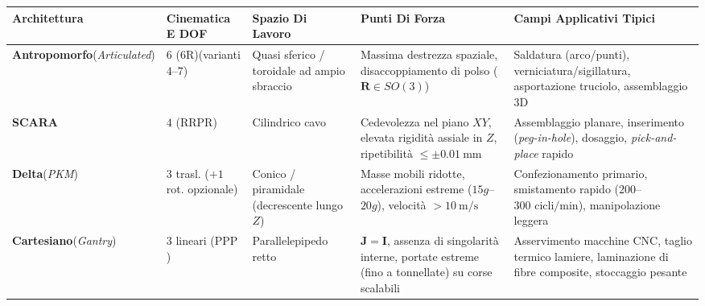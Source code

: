 ﻿\documentclass[11pt, a4paper]{article}
\begin{document}
\begin{table}[H]
    \centering
    \small
    \begin{tabular}{
        >{\raggedright\arraybackslash}p{2.3cm}
        >{\raggedright\arraybackslash}p{1.9cm}
        >{\raggedright\arraybackslash}p{2.3cm}
        >{\raggedright\arraybackslash}p{3.8cm}
        >{\raggedright\arraybackslash}p{3.7cm}
    }
        \toprule
        \textbf{Architettura} & \textbf{Cinematica E DOF} & \textbf{Spazio Di Lavoro} & \textbf{Punti Di Forza} & \textbf{Campi Applicativi Tipici} \\
        \midrule
        \textbf{Antropomorfo}\newline(\textit{Articulated})
            & $6$ ($6\text{R}$)\newline(varianti $4$--$7$)
            & Quasi sferico / toroidale ad ampio sbraccio
            & Massima destrezza spaziale, disaccoppiamento di polso ($\boldsymbol{R} \in SO(3)$)
            & Saldatura (arco/punti), verniciatura/sigillatura, asportazione truciolo, assemblaggio 3D \\
        \addlinespace
        \textbf{SCARA}
            & $4$ ($\text{RRPR}$)
            & Cilindrico cavo
            & Cedevolezza nel piano $XY$, elevata rigidità assiale in $Z$, ripetibilità $\le \pm \SI{0.01}{\milli\meter}$
            & Assemblaggio planare, inserimento (\textit{peg-in-hole}), dosaggio, \textit{pick-and-place} rapido \\
        \addlinespace
        \textbf{Delta}\newline(\textit{PKM})
            & $3$ trasl. ($+ 1$ rot. opzionale)
            & Conico / piramidale (decrescente lungo $Z$)
            & Masse mobili ridotte, accelerazioni estreme ($15g$--$20g$), velocità $> \SI{10}{\meter\per\second}$
            & Confezionamento primario, smistamento rapido ($200$--$300\text{ cicli/min}$), manipolazione leggera \\
        \addlinespace
        \textbf{Cartesiano}\newline(\textit{Gantry})
            & $3$ lineari ($\text{PPP}$)
            & Parallelepipedo retto
            & $\boldsymbol{J} = \boldsymbol{I}$, assenza di singolarità interne, portate estreme (fino a tonnellate) su corse scalabili
            & Asservimento macchine CNC, taglio termico lamiere, laminazione di fibre composite, stoccaggio pesante \\
        \bottomrule
    \end{tabular}
\end{table}
\end{document}
